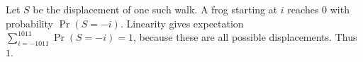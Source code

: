 Let $S$ be the displacement of one such walk. A frog starting at $i$ reaches 0 with probability $\Pr(S=-i)$. Linearity gives expectation $\sum_{i=-1011}^{1011}\Pr(S=-i)=1$, because these are all possible displacements. Thus $\boxed1$.
